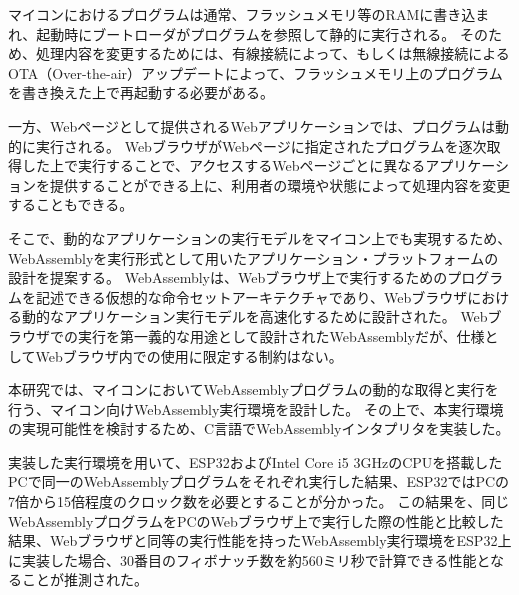 \begin{jabstract}

  マイコンにおけるプログラムは通常、フラッシュメモリ等のRAMに書き込まれ、起動時にブートローダがプログラムを参照して静的に実行される。
  そのため、処理内容を変更するためには、有線接続によって、もしくは無線接続によるOTA（Over-the-air）アップデートによって、フラッシュメモリ上のプログラムを書き換えた上で再起動する必要がある。

  一方、Webページとして提供されるWebアプリケーションでは、プログラムは動的に実行される。
  WebブラウザがWebページに指定されたプログラムを逐次取得した上で実行することで、アクセスするWebページごとに異なるアプリケーションを提供することができる上に、利用者の環境や状態によって処理内容を変更することもできる。

  そこで、動的なアプリケーションの実行モデルをマイコン上でも実現するため、WebAssemblyを実行形式として用いたアプリケーション・プラットフォームの設計を提案する。
  WebAssemblyは、Webブラウザ上で実行するためのプログラムを記述できる仮想的な命令セットアーキテクチャであり、Webブラウザにおける動的なアプリケーション実行モデルを高速化するために設計された。
  Webブラウザでの実行を第一義的な用途として設計されたWebAssemblyだが、仕様としてWebブラウザ内での使用に限定する制約はない。

  本研究では、マイコンにおいてWebAssemblyプログラムの動的な取得と実行を行う、マイコン向けWebAssembly実行環境を設計した。
  その上で、本実行環境の実現可能性を検討するため、C言語でWebAssemblyインタプリタを実装した。

  実装した実行環境を用いて、ESP32およびIntel Core i5 3GHzのCPUを搭載したPCで同一のWebAssemblyプログラムをそれぞれ実行した結果、ESP32ではPCの7倍から15倍程度のクロック数を必要とすることが分かった。
  この結果を、同じWebAssemblyプログラムをPCのWebブラウザ上で実行した際の性能と比較した結果、Webブラウザと同等の実行性能を持ったWebAssembly実行環境をESP32上に実装した場合、30番目のフィボナッチ数を約560ミリ秒で計算できる性能となることが推測された。

\end{jabstract}
